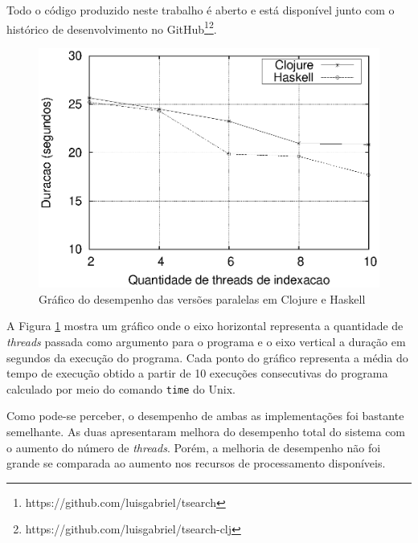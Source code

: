 Todo o código produzido neste trabalho é aberto e está disponível junto com o histórico de desenvolvimento no GitHub\footnote{https://github.com/luisgabriel/tsearch}\footnote{https://github.com/luisgabriel/tsearch-clj}.

\begin{figure}[h]
 \centering
 \includegraphics[scale=0.85]{imagens/clojure-haskell.eps}
 \caption{Gráfico do desempenho das versões paralelas em Clojure e Haskell}
 \label{fig:clj-hs-comp}
\end{figure}

A Figura \ref{fig:clj-hs-comp} mostra um gráfico onde o eixo horizontal representa a quantidade de \emph{threads} passada como argumento para o programa e o eixo vertical a duração em segundos da execução do programa. Cada ponto do gráfico representa a média do tempo de execução obtido a partir de 10 execuções consecutivas do programa calculado por meio do comando \verb|time| do Unix.

Como pode-se perceber, o desempenho de ambas as implementações foi bastante semelhante. As duas apresentaram melhora do desempenho total do sistema com o aumento do número de \emph{threads}. Porém, a melhoria de desempenho não foi grande se comparada ao aumento nos recursos de processamento disponíveis. 

